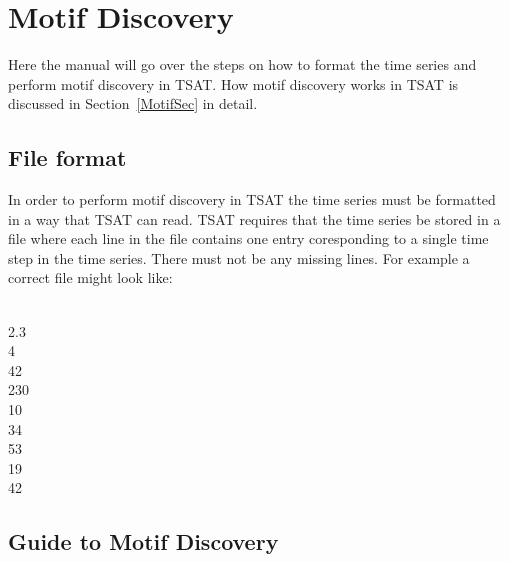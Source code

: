 \documentclass[titlepage, letterpaper, 12pt]{article}
\newenvironment{allintypewriter}{\ttfamily}{\par}
\begin{document}
\section{Motif Discovery}
\label{MotifGuide}

Here the manual will go over the steps on how to format the time series and perform motif discovery in TSAT.  How motif discovery works in TSAT is discussed in Section~\ref{MotifSec} in detail.

\subsection{File format}

In order to perform motif discovery in TSAT the time series must be formatted in a way that TSAT can read.  TSAT requires that the time series be stored in a file where each line in the file contains one entry coresponding to a single time step in the time series.  There must not be any missing lines.  For example a correct file might look like:

\begin{allintypewriter}
	\\
	2.3\\
	4\\
	42\\
	230\\
	10\\
	34\\
	53\\
	19\\
	42\\
\end{allintypewriter}

\vspace{-3em}
\subsection{Guide to Motif Discovery}
\end{document}
